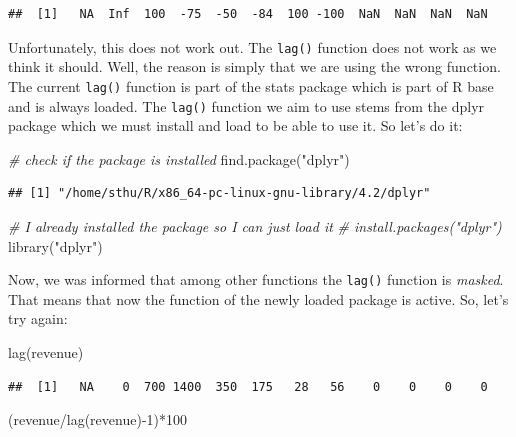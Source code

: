 \documentclass[
  12pt,
  oneside]{book}
\newenvironment{Shaded}{\begin{snugshade}}{\end{snugshade}}
\newcommand{\CommentTok}[1]{\textcolor[rgb]{0.56,0.35,0.01}{\textit{#1}}}
\newcommand{\DecValTok}[1]{\textcolor[rgb]{0.00,0.00,0.81}{#1}}
\newcommand{\FunctionTok}[1]{\textcolor[rgb]{0.00,0.00,0.00}{#1}}
\newcommand{\NormalTok}[1]{#1}
\newcommand{\SpecialCharTok}[1]{\textcolor[rgb]{0.00,0.00,0.00}{#1}}
\newcommand{\StringTok}[1]{\textcolor[rgb]{0.31,0.60,0.02}{#1}}
\begin{document}
\begin{verbatim}
##  [1]   NA  Inf  100  -75  -50  -84  100 -100  NaN  NaN  NaN  NaN
\end{verbatim}

Unfortunately, this does not work out. The \texttt{lag()} function does not work as we think it should. Well, the reason is simply that we are using the wrong function. The current \texttt{lag()} function is part of the stats package which is part of R base and is always loaded. The \texttt{lag()} function we aim to use stems from the dplyr package which we must install and load to be able to use it. So let's do it:

\begin{Shaded}
\begin{Highlighting}[]
\CommentTok{\# check if the package is installed}
\FunctionTok{find.package}\NormalTok{(}\StringTok{"dplyr"}\NormalTok{)}
\end{Highlighting}
\end{Shaded}

\begin{verbatim}
## [1] "/home/sthu/R/x86_64-pc-linux-gnu-library/4.2/dplyr"
\end{verbatim}

\begin{Shaded}
\begin{Highlighting}[]
\CommentTok{\# I already installed the package so I can just load it}
\CommentTok{\# install.packages("dplyr")}
\FunctionTok{library}\NormalTok{(}\StringTok{"dplyr"}\NormalTok{)}
\end{Highlighting}
\end{Shaded}

Now, we was informed that among other functions the \texttt{lag()} function is \emph{masked}. That means that now the function of the newly loaded package is active. So, let's try again:

\begin{Shaded}
\begin{Highlighting}[]
\FunctionTok{lag}\NormalTok{(revenue)}
\end{Highlighting}
\end{Shaded}

\begin{verbatim}
##  [1]   NA    0  700 1400  350  175   28   56    0    0    0    0
\end{verbatim}

\begin{Shaded}
\begin{Highlighting}[]
\NormalTok{(revenue}\SpecialCharTok{/}\FunctionTok{lag}\NormalTok{(revenue)}\SpecialCharTok{{-}}\DecValTok{1}\NormalTok{)}\SpecialCharTok{*}\DecValTok{100} 
\end{Highlighting}
\end{Shaded}
\end{document}
